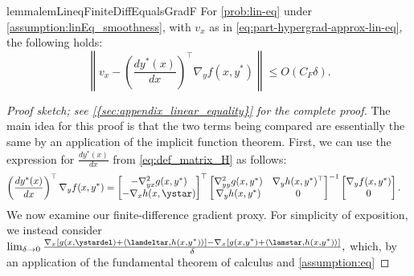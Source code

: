 \begin{restatable}{lemma}{lemLineqFiniteDiffEqualsGradF}\label{lem:lineq-finitediff-equals-gradf} 
For  \cref{prob:lin-eq}
under \cref{assumption:linEq_smoothness}, with $v_x$ as in \cref{eq:part-hypergrad-approx-lin-eq}, 
the
following holds:
\[
\textstyle{\left\|v_x-\left(\frac{d y^{*}(x)}{d x}\right)^\top\nabla_{y}f(x,y^{*})\right\|\leq O(C_F \delta).}
\]
\end{restatable}
\begin{proof}[Proof sketch; see \cref{{sec:appendix_linear_equality}} for the complete proof]
    The main idea for this proof is that the two terms being compared are essentially the same by an application of the implicit function theorem. First, we can use the expression for $\tfrac{dy^*(x)}{dx}$ from \cref{eq:def_matrix_H} as follows: 
\begin{align*}
\left(\frac{d y^{*}(x)}{d x}\right)^\top\nabla_{y}f(x,y^{*})
&=\begin{bmatrix}-\nabla^2_{yx} g(x,y^{*})\\
-\nabla_x h(x,\ystar)
\end{bmatrix}^\top\begin{bmatrix}\nabla^2_{yy} g(x,y^{*}) & \nabla_y h(x,y^{*})^{\top}\\
\nabla_y h(x,y^{*}) & 0
\end{bmatrix}^{-1}\begin{bmatrix}\nabla_{y}f(x,y^{*}) \\ 0\end{bmatrix}.
\end{align*} We now examine our finite-difference gradient proxy. For simplicity of exposition, we instead consider $\lim_{\delta\rightarrow0}\frac{\nabla_{x}[g(x,\ystardel)+\langle\lamdeltar, h(x,y^*)\rangle]-\nabla_{x}[g(x,y^{*})+\langle\lamstar, h(x,y^{*})\rangle]}{\delta},$ which, by an application of the fundamental theorem of calculus and \cref{assumption:eq}%

\end{proof}
